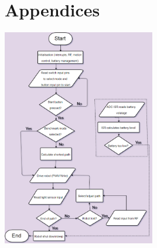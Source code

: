 \documentclass{article}
\begin{document}
\clearpage

\section{Appendices}

\includegraphics[width=0.5\textwidth]{software_flowchart.png}

\vfill
\end{document}
